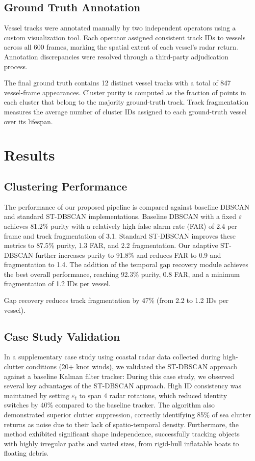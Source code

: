 \documentclass[conf]{new-aiaa}
\begin{document}
\subsection{Ground Truth Annotation}
Vessel tracks were annotated manually by two independent operators using a custom visualization tool. Each operator assigned consistent track IDs to vessels across all 600 frames, marking the spatial extent of each vessel's radar return. Annotation discrepancies were resolved through a third-party adjudication process.

The final ground truth contains 12 distinct vessel tracks with a total of 847 vessel-frame appearances. Cluster purity is computed as the fraction of points in each cluster that belong to the majority ground-truth track. Track fragmentation measures the average number of cluster IDs assigned to each ground-truth vessel over its lifespan.

\section{Results}

\subsection{Clustering Performance}
The performance of our proposed pipeline is compared against baseline DBSCAN and standard ST-DBSCAN implementations. Baseline DBSCAN with a fixed $\varepsilon$ achieves 81.2\% purity with a relatively high false alarm rate (FAR) of 2.4 per frame and track fragmentation of 3.1. Standard ST-DBSCAN improves these metrics to 87.5\% purity, 1.3 FAR, and 2.2 fragmentation. Our adaptive ST-DBSCAN further increases purity to 91.8\% and reduces FAR to 0.9 and fragmentation to 1.4. The addition of the temporal gap recovery module achieves the best overall performance, reaching 92.3\% purity, 0.8 FAR, and a minimum fragmentation of 1.2 IDs per vessel.

Gap recovery reduces track fragmentation by 47\% (from 2.2 to 1.2 IDs per vessel).

\subsection{Case Study Validation}
In a supplementary case study using coastal radar data collected during high-clutter conditions (20+ knot winds), we validated the ST-DBSCAN approach against a baseline Kalman filter tracker:
During this case study, we observed several key advantages of the ST-DBSCAN approach. High ID consistency was maintained by setting $\varepsilon_t$ to span 4 radar rotations, which reduced identity switches by 40\% compared to the baseline tracker. The algorithm also demonstrated superior clutter suppression, correctly identifying 85\% of sea clutter returns as noise due to their lack of spatio-temporal density. Furthermore, the method exhibited significant shape independence, successfully tracking objects with highly irregular paths and varied sizes, from rigid-hull inflatable boats to floating debris.
\end{document}

